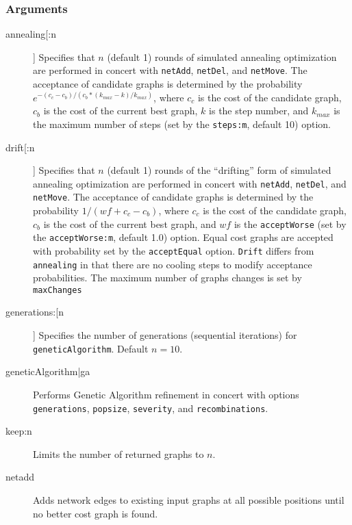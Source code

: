 	\subsubsection{Arguments}
		
		\begin{description}
		\item[annealing[:n]] Specifies that $n$ (default 1) rounds of simulated annealing optimization 
		\citep{Metropolisetal1953, Kirkpatricketal1983, Cerny1985} are performed in concert with 
		\texttt{netAdd}, \texttt{netDel}, and \texttt{netMove}. The acceptance of candidate graphs is 
		determined by the probability $e ^ {- (c_c - c_b)/ (c_b * (k_{max} -k)/ k_{max})}$, where $c_c$ 
		is the cost of the candidate graph, $c_b$ is the cost of the current best graph, $k$ is the step number, 
		and $k_{max}$ is the maximum number of steps (set by the \texttt{steps:m}, default 10) option.
			
		\item[drift[:n]] Specifies that $n$ (default 1) rounds of the ``drifting'' form of simulated annealing \citep{goloboff1999} 
		optimization are performed in concert with \texttt{netAdd}, 	\texttt{netDel}, and \texttt{netMove}. The acceptance of 
		candidate graphs is determined by the probability $1/ (wf + c_c - c_b)$, where $c_c$ is the cost of the candidate 
		graph, $c_b$ is the cost of the current best graph, and $wf$ is the \texttt{acceptWorse} (set by the 
		\texttt{acceptWorse:m}, default 1.0) option. Equal cost graphs are accepted with probability set by the 
		\texttt{acceptEqual} option. \texttt{Drift} differs from \texttt{annealing} in that there are no cooling steps to modify 
		acceptance probabilities. The maximum number of graphs changes is set by \texttt{maxChanges}
			
		\item[generations:[n]] Specifies the number of generations (sequential iterations) for \texttt{geneticAlgorithm}. 
		Default $n=10$.
			
		\item[geneticAlgorithm|ga] Performs Genetic Algorithm \citep{Holland1975} refinement in concert with options \\
		\texttt{generations}, \texttt{popsize}, \texttt{severity}, and \texttt{recombinations}. 
			
		\item[keep:n] Limits the number of returned graphs to $n$. 
		
		\item[netadd] Adds network edges to existing input graphs at all possible positions until no better cost graph is found.
			

\end{description}

